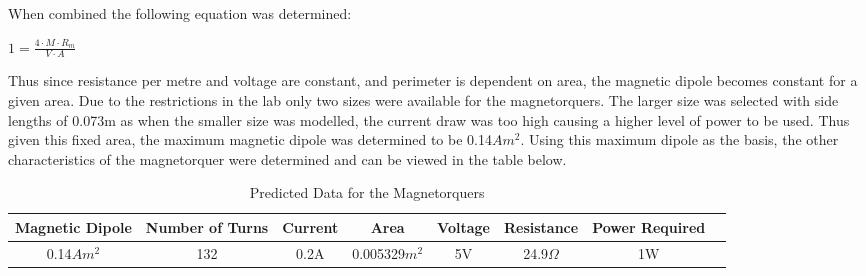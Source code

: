 When combined the following equation was determined:
\begin{center}
$1 = \frac{4 \cdot M \cdot R_m}{V \cdot A}$
\end{center}
Thus since resistance per metre and voltage are constant, and perimeter is dependent on area, the magnetic dipole becomes constant for a given area.  Due to the restrictions in the lab only two sizes were available for the magnetorquers. The larger size was selected with side lengths of 0.073m as when the smaller size was modelled, the current draw was too high causing a higher level of power to be used.  Thus given this fixed area, the maximum magnetic dipole was determined to be  0.14$Am^2$.  Using this maximum dipole as the basis, the other characteristics of the magnetorquer were determined and can be viewed in the table below.


\begin{table}[H]
\begin{center}
\caption{Predicted Data for the Magnetorquers}
\begin{tabular}{|c|c|c|c|c|c|c|c|}
\hline
Magnetic Dipole & Number of Turns & Current & Area & Voltage & Resistance & Power Required\\
\hline
0.14$Am^2$ & 132 & 0.2A & 0.005329$m^2$ & 5V & 24.9$\Omega$ & 1W\\
\hline
\end{tabular}
\end{center}
\vspace{-6mm}
\end{table}

